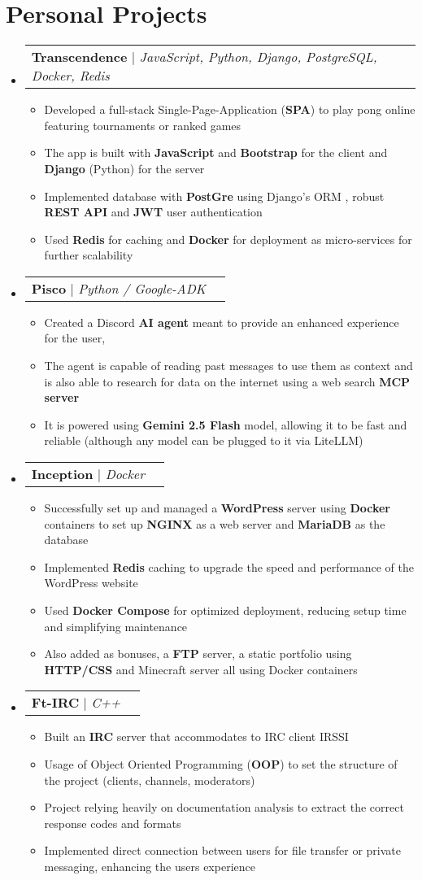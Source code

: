 \documentclass[letterpaper,11pt]{article}
\makeatletter
\newcommand{\resumeItem}[1]{
  \item\small{
    {#1 \vspace{-2pt}}
  }
}
\newcommand{\resumeProjectHeading}[2]{
    \item
    \begin{tabular*}{0.97\textwidth}{l@{\extracolsep{\fill}}r}
      \small#1 & #2 \\
    \end{tabular*}\vspace{-7pt}
}
\newcommand{\resumeSubHeadingListStart}{\begin{itemize}[leftmargin=0.15in, label={}]}
\newcommand{\resumeSubHeadingListEnd}{\end{itemize}}
\newcommand{\resumeItemListStart}{\begin{itemize}}
\newcommand{\resumeItemListEnd}{\end{itemize}\vspace{-5pt}}
\makeatother
\begin{document}
\section{Personal Projects}
    \vspace{2pt}
    \resumeSubHeadingListStart
        \resumeProjectHeading
          {\textbf{Transcendence} $|$ \emph{JavaScript, Python, Django, PostgreSQL, Docker, Redis}}{}
          \resumeItemListStart
            \resumeItem{Developed a full-stack Single-Page-Application (\textbf{SPA}) to play pong online featuring tournaments or ranked games}
            \resumeItem{The app is built with \textbf{JavaScript} and \textbf{Bootstrap} for the client and \textbf{Django} (Python) for the server}
            \resumeItem{Implemented database with \textbf{PostGre} using Django's ORM , robust \textbf{REST API} and \textbf{JWT} user authentication}
            \resumeItem{Used \textbf{Redis} for caching and \textbf{Docker} for deployment as micro-services for further scalability}
          \resumeItemListEnd
        \resumeProjectHeading
          {\textbf{Pisco} $|$ \emph{Python / Google-ADK}}{}
          \resumeItemListStart
            \resumeItem{Created a Discord \textbf{AI agent} meant to provide an enhanced experience for the user, }
            \resumeItem{The agent is capable of reading past messages to use them as context and is also able to research for data on the internet using a web search \textbf{MCP server}}
            \resumeItem{It is powered using \textbf{Gemini 2.5 Flash} model, allowing it to be fast and reliable (although any model can be plugged to it via LiteLLM)}
          \resumeItemListEnd
        \resumeProjectHeading
          {\textbf{Inception} $|$ \emph{Docker}}{}
          \resumeItemListStart
            \resumeItem{Successfully set up and managed a \textbf{WordPress} server using \textbf{Docker} containers to set up \textbf{NGINX} as a web server and \textbf{MariaDB} as the database}
            \resumeItem{Implemented \textbf{Redis} caching to upgrade the speed and performance of the WordPress website}
            \resumeItem{Used \textbf{Docker Compose} for optimized deployment, reducing setup time and simplifying maintenance}
            \resumeItem{Also added as bonuses, a \textbf{FTP} server, a static portfolio using \textbf{HTTP/CSS} and Minecraft server all using Docker containers}
          \resumeItemListEnd
        \resumeProjectHeading
          {\textbf{Ft-IRC} $|$ \emph{C++}}{}
          \resumeItemListStart
            \resumeItem{Built an \textbf{IRC} server that accommodates to IRC client IRSSI}
            \resumeItem{Usage of Object Oriented Programming (\textbf{OOP}) to set the structure of the project (clients, channels, moderators)}
            \resumeItem{Project relying heavily on documentation analysis to extract the correct response codes and formats}
            \resumeItem{Implemented direct connection between users for file transfer or private messaging, enhancing the users experience}
          \resumeItemListEnd
    \resumeSubHeadingListEnd
\end{document}
